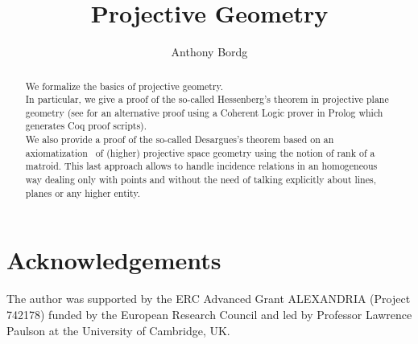 \documentclass[11pt,a4paper]{article}
\begin{document}
\title{Projective Geometry}
\author{Anthony Bordg}
\maketitle

\begin{abstract}
We formalize the basics of projective geometry. \\ In particular, we give a proof of the so-called Hessenberg's theorem in projective plane geometry (see \cite{Bezem2008} for an alternative proof using a Coherent Logic prover in Prolog which generates Coq proof scripts). \\ We also provide a proof of the so-called Desargues's theorem based on an axiomatization~\cite{Magaud_2012} of (higher) projective space geometry using the notion of rank of a matroid. This last approach allows to handle incidence relations in an homogeneous way dealing only with points and without the need of talking explicitly about lines, planes or any higher entity.
\end{abstract}

\tableofcontents




\section{Acknowledgements}
The author was supported by the ERC Advanced Grant ALEXANDRIA (Project 742178) funded by the European Research Council and led by Professor Lawrence Paulson at the University of Cambridge, UK.




\end{document}
